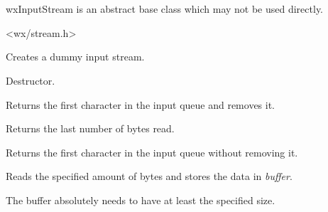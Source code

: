 \section{}\label{wxinputstream}

wxInputStream is an abstract base class which may not be used directly.




<wx/stream.h>



Creates a dummy input stream.



Destructor.



Returns the first character in the input queue and removes it.

\label{wxinputstreamlastread}


Returns the last number of bytes read.



Returns the first character in the input queue without removing it.



Reads the specified amount of bytes and stores the data in {\it buffer}.


The buffer absolutely needs to have at least the specified size.


